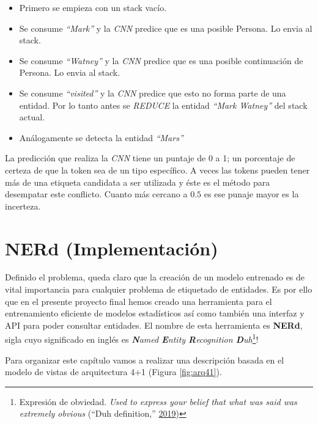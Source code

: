 \documentclass[12pt,a4paper,]{scrartcl}
\providecommand{\tightlist}{%
  \setlength{\itemsep}{0pt}\setlength{\parskip}{0pt}}
\let\rmarkdownfootnote\footnote%
\def\footnote{\protect\rmarkdownfootnote}
\begin{document}
\begin{itemize}
\tightlist
\item
  Primero se empieza con un stack vacío.
\item
  Se consume \emph{\enquote{Mark}} y la \emph{CNN} predice que es una posible Persona. Lo envia al stack.
\item
  Se consume \emph{\enquote{Watney}} y la \emph{CNN} predice que es una posible continuación de Persona. Lo envia al stack.
\item
  Se consume \emph{\enquote{visited}} y la \emph{CNN} predice que esto no forma parte de una entidad. Por lo tanto antes se \emph{REDUCE} la entidad \emph{\enquote{Mark Watney}} del stack actual.
\item
  Análogamente se detecta la entidad \emph{\enquote{Mars}}
\end{itemize}

La predicción que realiza la \emph{CNN} tiene un puntaje de 0 a 1; un porcentaje de certeza de que la token sea de un tipo específico. A veces las tokens pueden tener más de una etiqueta candidata a ser utilizada y éste es el método para desempatar este conflicto. Cuanto más cercano a \(0.5\) es ese punaje mayor es la incerteza.

\newpage

\hypertarget{implementation}{%
\section{NERd (Implementación)}\label{implementation}}

Definido el problema, queda claro que la creación de un modelo entrenado es de vital importancia para cualquier problema de etiquetado de entidades.
Es por ello que en el presente proyecto final hemos creado una herramienta para el entrenamiento eficiente de modelos estadísticos así como también una interfaz y API para poder consultar entidades.
El nombre de esta herramienta es \textbf{NERd}, sigla cuyo significado en inglés es \emph{\textbf{N}amed \textbf{E}ntity \textbf{R}ecognition \textbf{D}uh}\footnote{Expresión de obviedad. \emph{Used to express your belief that what was said was extremely obvious} (``Duh definition,'' \protect\hyperlink{ref-cambridge_duh}{2019})}!

Para organizar este capítulo vamos a realizar una descripción basada en el modelo de vistas de arquitectura 4+1 (Figura \ref{fig:arq41}).
\end{document}
